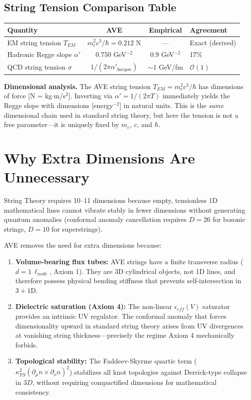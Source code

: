 \subsection{String Tension Comparison Table}
\begin{center}
\small
\renewcommand{\arraystretch}{1.2}
\begin{tabular}{lccl}
\toprule
\textbf{Quantity} & \textbf{AVE} & \textbf{Empirical} & \textbf{Agreement} \\
\midrule
EM string tension $T_{EM}$    & $m_e^2 c^3/\hbar = 0.212$ N & --- & Exact (derived) \\
Hadronic Regge slope $\alpha'$       & $0.750$ GeV$^{-2}$ & $0.9$ GeV$^{-2}$ & $17\%$ \\
QCD string tension $\sigma$          & $1/(2\pi\alpha'_{baryon})$ & $\sim 1$ GeV/fm & $\mathcal{O}(1)$ \\
\bottomrule
\end{tabular}
\end{center}

\noindent\textbf{Dimensional analysis.}  The AVE string tension $T_{EM} = m_e^2 c^3 / \hbar$ has dimensions of force [N = kg$\cdot$m/s$^2$]. Inverting via $\alpha' = 1/(2\pi T)$ immediately yields the Regge slope with dimensions [energy$^{-2}$] in natural units. This is the \emph{same} dimensional chain used in standard string theory, but here the tension is not a free parameter---it is uniquely fixed by $m_e$, $c$, and $\hbar$.

\section{Why Extra Dimensions Are Unnecessary}
String Theory requires 10--11 dimensions because empty, tensionless 1D mathematical lines cannot vibrate stably in fewer dimensions without generating quantum anomalies (conformal anomaly cancellation requires $D=26$ for bosonic strings, $D=10$ for superstrings).

AVE removes the need for extra dimensions because:
\begin{enumerate}
    \item \textbf{Volume-bearing flux tubes:} AVE strings have a finite transverse radius ($d = 1\, \ell_{node}$, Axiom 1). They are 3D cylindrical objects, not 1D lines, and therefore possess physical bending stiffness that prevents self-intersection in $3+1$D.
    \item \textbf{Dielectric saturation (Axiom 4):} The non-linear $\epsilon_{eff}(V)$ saturator provides an intrinsic UV regulator. The conformal anomaly that forces dimensionality upward in standard string theory arises from UV divergences at vanishing string thickness---precisely the regime Axiom 4 mechanically forbids.
    \item \textbf{Topological stability:} The Faddeev-Skyrme quartic term ($\kappa_{FS}^2 (\partial_\mu n \times \partial_\nu n)^2$) stabilizes all knot topologies against Derrick-type collapse in $3D$, without requiring compactified dimensions for mathematical consistency.
\end{enumerate}

